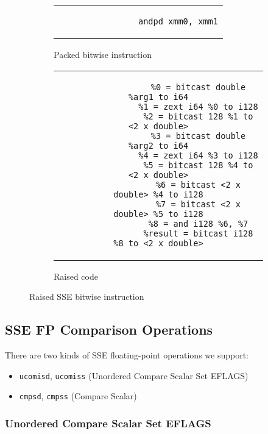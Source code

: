 \begin{figure}[htpb]
    \centering
    \begin{subfigure}{.45\textwidth}
        \begin{tabular}{c}
            \begin{lstlisting}
                andpd xmm0, xmm1
            \end{lstlisting}
        \end{tabular}
        \caption{Packed bitwise instruction}
    \end{subfigure}
    \begin{subfigure}{.45\textwidth}
        \begin{tabular}{c}
            \begin{lstlisting}
                %0 = bitcast double %arg1 to i64
                %1 = zext i64 %0 to i128
                %2 = bitcast 128 %1 to <2 x double>
                %3 = bitcast double %arg2 to i64
                %4 = zext i64 %3 to i128
                %5 = bitcast 128 %4 to <2 x double>
                %6 = bitcast <2 x double> %4 to i128
                %7 = bitcast <2 x double> %5 to i128
                %8 = and i128 %6, %7
                %result = bitcast i128 %8 to <2 x double>
            \end{lstlisting}
        \end{tabular}
        \caption{Raised code}
    \end{subfigure}
    \caption{Raised SSE bitwise instruction}
    \label{fig:raised-fp-bitwise}
\end{figure}

\subsection{SSE FP Comparison Operations}\label{subsec:sse-fp-comparison-operations}

There are two kinds of SSE floating-point operations we support:

\begin{itemize}
    \item \texttt{ucomisd}, \texttt{ucomiss} (Unordered Compare Scalar Set EFLAGS)
    \item \texttt{cmpsd}, \texttt{cmpss} (Compare Scalar)
\end{itemize}

\subsubsection[UCOMIS]{Unordered Compare Scalar Set EFLAGS}

